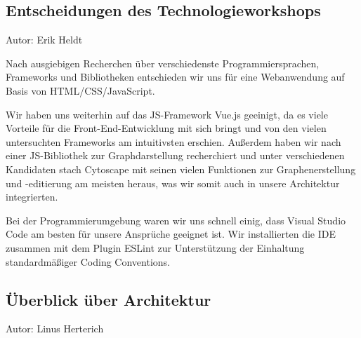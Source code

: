 \documentclass[twoside]{report}
\begin{document}
\subsection{Entscheidungen des Technologieworkshops}
{\small Autor: Erik Heldt}

Nach ausgiebigen Recherchen über verschiedenste Programmiersprachen, Frameworks und Bibliotheken entschieden wir uns für eine Webanwendung auf Basis von HTML/CSS/JavaScript.

Wir haben uns weiterhin auf das JS-Framework Vue.js geeinigt, da es viele Vorteile für die Front-End-Entwicklung mit sich bringt und von den vielen untersuchten Frameworks am intuitivsten erschien. Außerdem haben wir nach einer JS-Bibliothek zur Graphdarstellung recherchiert und unter verschiedenen Kandidaten stach Cytoscape mit seinen vielen Funktionen zur Graphenerstellung und -editierung am meisten heraus, was wir somit auch in unsere Architektur integrierten.

Bei der Programmierumgebung waren wir uns schnell einig, dass Visual Studio Code am besten für unsere Ansprüche geeignet ist. Wir installierten die IDE zusammen mit dem Plugin ESLint zur Unterstützung der Einhaltung standardmäßiger Coding Conventions.

\subsection{Überblick über Architektur}
{\small Autor: Linus Herterich}
\end{document}
